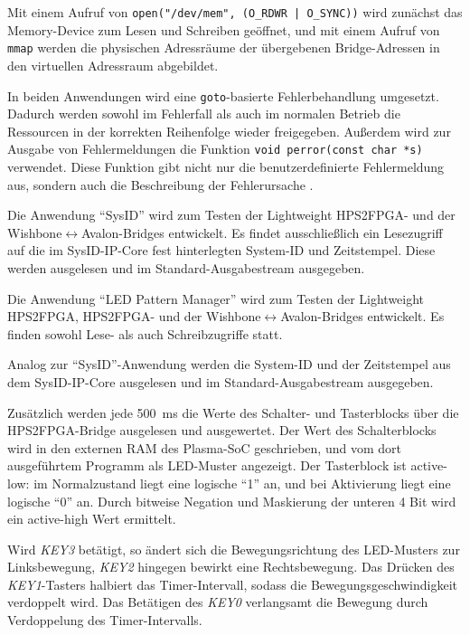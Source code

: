 Mit einem Aufruf von \texttt{open("/dev/mem", (O\_RDWR | O\_SYNC))} wird zunächst das Memory-Device zum Lesen und Schreiben geöffnet, und mit einem Aufruf von \texttt{mmap} werden die physischen Adressräume der übergebenen \gls{Bridge}-Adressen in den virtuellen Adressraum abgebildet. 

In beiden Anwendungen wird eine \texttt{goto}-basierte Fehlerbehandlung umgesetzt. Dadurch werden sowohl im Fehlerfall als auch im normalen Betrieb die Ressourcen in der korrekten Reihenfolge wieder freigegeben. Außerdem wird zur Ausgabe von Fehlermeldungen die Funktion \texttt{void perror(const char *s)} verwendet. Diese Funktion gibt nicht nur die benutzerdefinierte Fehlermeldung aus, sondern  auch die Beschreibung der Fehlerursache \cite[50f]{book:c_and_linux}.

Die Anwendung \enquote{SysID} wird zum Testen der Lightweight HPS2FPGA- und der Wishbone{$\leftrightarrow$}Avalon-\glspl{Bridge} entwickelt. Es findet ausschließlich ein Lesezugriff auf die im SysID-IP-Core fest hinterlegten System-ID und Zeitstempel. Diese werden ausgelesen und im Standard-Ausgabestream ausgegeben. 

Die Anwendung \enquote{LED Pattern Manager} wird zum Testen der Lightweight HPS2FPGA, HPS2FPGA- und der Wishbone{$\leftrightarrow$}Avalon-\glspl{Bridge} entwickelt. Es finden sowohl Lese- als auch Schreibzugriffe statt. 

Analog zur \enquote{SysID}-Anwendung werden die System-ID und der Zeitstempel aus dem SysID-IP-Core ausgelesen und im Standard-Ausgabestream ausgegeben. 

Zusätzlich werden jede \SI{500}{\milli\second} die Werte des Schalter- und Tasterblocks über die HPS2FPGA-\gls{Bridge} ausgelesen und ausgewertet. Der Wert des Schalterblocks wird in den externen \gls{RAM} des Plasma-\gls{SoC} geschrieben, und vom dort ausgeführtem Programm als LED-Muster angezeigt. Der Tasterblock ist active-low: im Normalzustand liegt eine logische \enquote{1} an, und bei Aktivierung liegt eine logische \enquote{0} an. Durch bitweise Negation und Maskierung der unteren 4 Bit wird ein active-high Wert ermittelt.

Wird \textit{KEY3} betätigt, so ändert sich die Bewegungsrichtung des LED-Musters zur Linksbewegung, \textit{KEY2} hingegen bewirkt eine Rechtsbewegung.  
 Das Drücken des \textit{KEY1}-Tasters halbiert das Timer-Intervall, sodass die Bewegungsgeschwindigkeit verdoppelt wird. Das Betätigen des \textit{KEY0} verlangsamt die Bewegung durch Verdoppelung des Timer-Intervalls.  
  
